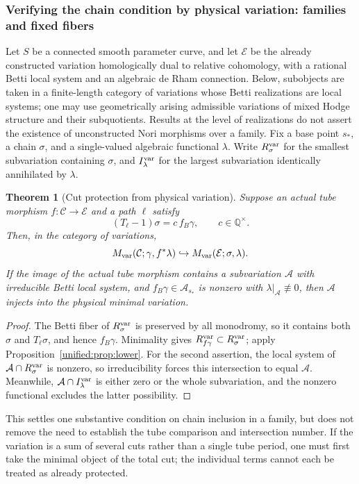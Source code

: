 \documentclass[11pt,a4paper,oneside]{article}
\theoremstyle{plain}
\newtheorem{theorem}{Theorem}[section]
\theoremstyle{definition}
\theoremstyle{remark}
\newcommand{\Q}{\mathbb Q}
\numberwithin{equation}{section}
\begin{document}
\subsubsection{Verifying the chain condition by physical variation: families and fixed fibers}
Let $S$ be a connected smooth parameter curve, and let $\mathcal E$ be the already constructed variation
homologically dual to relative cohomology, with a rational Betti local system and an algebraic de Rham connection.
Below, subobjects are taken in a finite-length category of variations whose Betti realizations are local systems;
one may use geometrically arising admissible variations of mixed Hodge structure and their subquotients.
Results at the level of realizations do not assert the existence of unconstructed Nori morphisms over a family.
Fix a base point $s_*$, a chain $\sigma$, and a single-valued algebraic functional $\lambda$.
Write $R_\sigma^{\rm var}$ for the smallest subvariation containing $\sigma$,
and $I_\lambda^{\rm var}$ for the largest subvariation identically annihilated by $\lambda$.

\begin{theorem}[Cut protection from physical variation]\label{unified:thm:variation}
Suppose an actual tube morphism $f:\mathcal C\to\mathcal E$ and a path $\ell$ satisfy
\[
 (T_\ell-1)\sigma=c\,f_B\gamma,\qquad c\in\Q^\times.
\]
Then, in the category of variations,
\[
 M_{\rm var}(\mathcal C;\gamma,f^*\lambda)
 \hookrightarrow M_{\rm var}(\mathcal E;\sigma,\lambda).
\]
If the image of the actual tube morphism contains a subvariation $\mathcal A$ with irreducible Betti local system,
and $f_B\gamma\in\mathcal A_{s_*}$ is nonzero with $\lambda|_{\mathcal A}\not\equiv0$,
then $\mathcal A$ injects into the physical minimal variation.
\end{theorem}
\begin{proof}
The Betti fiber of $R_\sigma^{\rm var}$ is preserved by all monodromy, so it contains both $\sigma$
and $T_\ell\sigma$, and hence $f_B\gamma$. Minimality gives
$R_{f\gamma}^{\rm var}\subset R_\sigma^{\rm var}$; apply Proposition~\ref{unified:prop:lower}.
For the second assertion, the local system of $\mathcal A\cap R_\sigma^{\rm var}$ is nonzero,
so irreducibility forces this intersection to equal $\mathcal A$. Meanwhile,
$\mathcal A\cap I_\lambda^{\rm var}$ is either zero or the whole subvariation,
and the nonzero functional excludes the latter possibility.
\end{proof}
This settles one substantive condition on chain inclusion in a family, but does not remove the need to establish the tube comparison and intersection number.
If the variation is a sum of several cuts rather than a single tube period, one must first take the minimal object of the total cut;
the individual terms cannot each be treated as already protected.
\end{document}
